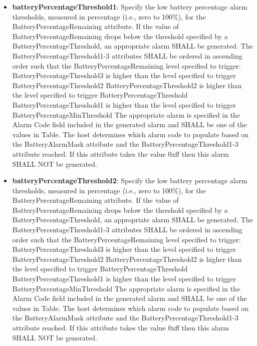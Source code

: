 \begin{itemize}
\item \textbf{batteryPercentageThreshold1}: Specify the low battery percentage alarm thresholds, measured in percentage (i.e., zero to 100\%), for the BatteryPercentageRemaining attribute. If the value of BatteryPercentageRemaining drops below the threshold specified by a BatteryPercentageThreshold, an appropriate alarm SHALL be generated. The BatteryPercentageThreshold1-3 attributes SHALL be ordered in ascending order such that the BatteryPercentageRemaining level specified to trigger: BatteryPercentageThreshold3 is higher than the level specified to trigger BatteryPercentageThreshold2 BatteryPercentageThreshold2 is higher than the level specified to trigger BatteryPercentageThreshold BatteryPercentageThreshold1 is higher than the level specified to trigger BatteryPercentageMinThreshold The appropriate alarm is specified in the Alarm Code field included in the generated alarm and SHALL be one of the values in Table. The host determines which alarm code to populate based on the BatteryAlarmMask attribute and the BatteryPercentageThreshold1-3 attribute reached. If this attribute takes the value 0xff then this alarm SHALL NOT be generated.
\item \textbf{batteryPercentageThreshold2}: Specify the low battery percentage alarm thresholds, measured in percentage (i.e., zero to 100\%), for the BatteryPercentageRemaining attribute. If the value of BatteryPercentageRemaining drops below the threshold specified by a BatteryPercentageThreshold, an appropriate alarm SHALL be generated. The BatteryPercentageThreshold1-3 attributes SHALL be ordered in ascending order such that the BatteryPercentageRemaining level specified to trigger: BatteryPercentageThreshold3 is higher than the level specified to trigger BatteryPercentageThreshold2 BatteryPercentageThreshold2 is higher than the level specified to trigger BatteryPercentageThreshold BatteryPercentageThreshold1 is higher than the level specified to trigger BatteryPercentageMinThreshold The appropriate alarm is specified in the Alarm Code field included in the generated alarm and SHALL be one of the values in Table. The host determines which alarm code to populate based on the BatteryAlarmMask attribute and the BatteryPercentageThreshold1-3 attribute reached. If this attribute takes the value 0xff then this alarm SHALL NOT be generated.

\end{itemize}
